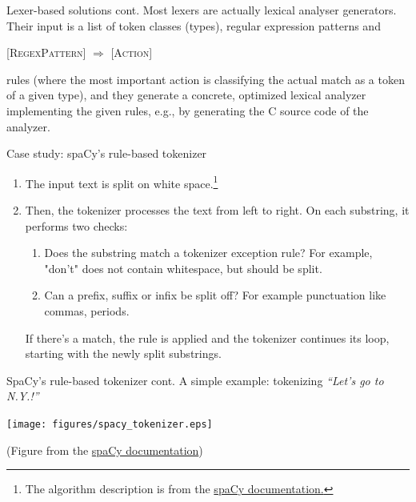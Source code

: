 \documentclass[style=upen, size=14pt]{powerdot}
\theoremstyle{definition}
\begin{document}
\begin{slide}[toc=]{Lexer-based solutions cont.}
  Most lexers are actually lexical analyser generators. Their input is a list of
  token classes (types), regular expression patterns and\smallskip

  \begin{center}
    [\textsc{RegexPattern}] $\Rightarrow$ [\textsc{Action}]\smallskip
  \end{center}

rules (where the most important action is classifying the actual match as a
token of a given type), and they generate a concrete, optimized lexical analyzer
implementing the given rules, e.g., by generating the C source code of the
analyzer.
\end{slide}

\begin{slide}[toc=spaCy]{Case study: spaCy's rule-based tokenizer}

  \begin{enumerate}
  \item The input text is split on white space.\footnote{The algorithm
    description is from the
    \href{https://spacy.io/usage/linguistic-features\#tokenization}{spaCy
      documentation.}}
  \item Then, the tokenizer processes the text from left to right. On each
    substring, it performs two checks:
    \begin{enumerate}
    \item Does the substring match a tokenizer exception rule? For example,
      "don't" does not contain whitespace, but should be split.
    \item Can a prefix, suffix or infix be split off? For example punctuation
      like commas, periods.
    \end{enumerate}
    If there's a match, the rule is applied and the tokenizer continues
    its loop, starting with the newly split substrings.
  \end{enumerate}

\end{slide}

\begin{slide}[toc=]{SpaCy's rule-based tokenizer cont.}
  A simple example: tokenizing \emph{``Let's go to N.Y.!''}
    \begin{center}
      \texttt{[image: figures/spacy\_tokenizer.eps]}\
      
      \footnotesize{(Figure from the \href{https://spacy.io/usage/linguistic-features\#tokenization}{spaCy documentation})}
    \end{center}
\end{slide}
\end{document}
